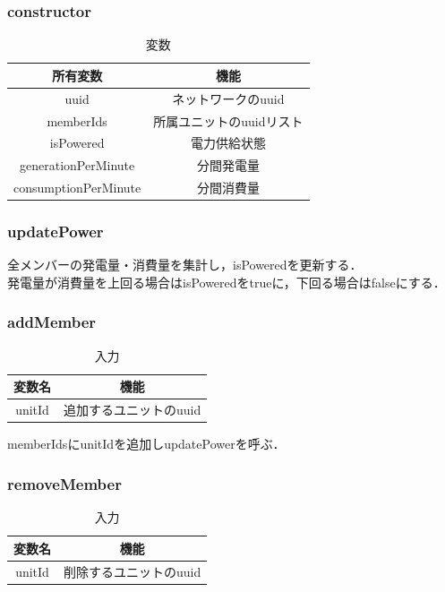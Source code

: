 \documentclass[uplatex,dvipdfmx,report]{jlreq}
\begin{document}
\subsubsection{constructor}

\begin{table}[H]
    \centering
    \caption{変数}
    \begin{tabular}{cc}
        \hline
        所有変数 & 機能 \\
        \hline
        \hline
        uuid & ネットワークのuuid \\
        memberIds & 所属ユニットのuuidリスト \\
        isPowered & 電力供給状態 \\
        generationPerMinute & 分間発電量 \\
        consumptionPerMinute & 分間消費量 \\
        \hline
    \end{tabular}
\end{table}

\subsubsection{updatePower}

全メンバーの発電量・消費量を集計し，isPoweredを更新する．\\
発電量が消費量を上回る場合はisPoweredをtrueに，下回る場合はfalseにする．

\subsubsection{addMember}

\begin{table}[H]
    \centering
    \caption{入力}
    \begin{tabular}{cc}
        \hline
        変数名 & 機能 \\
        \hline
        \hline
        unitId & 追加するユニットのuuid \\
        \hline
    \end{tabular}
\end{table}

memberIdsにunitIdを追加しupdatePowerを呼ぶ．

\subsubsection{removeMember}

\begin{table}[H]
    \centering
    \caption{入力}
    \begin{tabular}{cc}
        \hline
        変数名 & 機能 \\
        \hline
        \hline
        unitId & 削除するユニットのuuid \\
        \hline
    \end{tabular}
\end{table}
\end{document}
